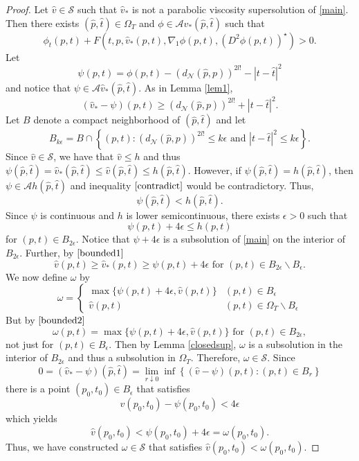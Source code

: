\documentclass[12pt]{amsart}
\theoremstyle{definition}
\theoremstyle{remark}
\numberwithin{equation}{section}
\begin{document}
\begin{proof}  Let $\hat{v} \in \mathcal{S}$ such that $\hat{v}_*$ is not a parabolic viscosity supersolution of \eqref{main}.  Then there exists $(\hat{p},\hat{t}) \in \Omega_T$ and $\phi \in \mathcal{A}\hat{v}_*(\hat{p},\hat{t})$ such that 
\begin{equation}\label{contradict}
\phi_t(p,t)+F(t,p,\hat{v}_*(p,t),\nabla_1\phi(p,t), (D^2\phi(p,t))^\star) > 0.
\end{equation}
Let
$$\psi(p,t) = \phi(p,t) - \left(d_\mathcal{N}(\hat{p},p)\right)^{2l!} - |t-\hat{t}|^2$$
and notice that $\psi \in \mathcal{A}\hat{v}_*(\hat{p},\hat{t})$.
As in Lemma \ref{lem1}, 
\begin{equation}\label{bounded1}
(\hat{v}_*-\psi)(p,t) \geq \left(d_\mathcal{N}(\hat{p},p)\right)^{2l!} + |t-\hat{t}|^2.
\end{equation}
Let $B$ denote a compact neighborhood of $(\hat{p},\hat{t})$ and let $$B_{k\epsilon} = B \cap \left\{ (p,t) : \left(d_\mathcal{N}(\hat{p},p)\right)^{2l!} \leq k\epsilon \text{ and } |t-\hat{t}|^2 \leq k\epsilon \right\}.$$  Since $\hat{v} \in \mathcal{S}$, we have that $\hat{v} \leq h$ and thus $\psi(\hat{p},\hat{t})=\hat{v}_*(\hat{p},\hat{t}) \leq \hat{v}(\hat{p},\hat{t})  \leq h(\hat{p},\hat{t})$.  However, if $\psi(\hat{p},\hat{t}) = h(\hat{p},\hat{t})$, then $\psi \in \mathcal{A}h(\hat{p},\hat{t})$ and inequality $\eqref{contradict}$ would be contradictory.  Thus, 
$$\psi(\hat{p},\hat{t}) < h(\hat{p},\hat{t}).$$
Since $\psi$ is continuous and $h$ is lower semicontinuous, there exists $\epsilon > 0$ such that 
$$\psi(p,t) + 4\epsilon \leq h(p,t)$$
for $(p,t) \in B_{2\epsilon}$. Notice that $\psi + 4\epsilon$ is a subsolution of \eqref{main} on the interior of $B_{2\epsilon}$.  Further, by $\eqref{bounded1}$
\begin{equation}\label{bounded2}
\hat{v}(p,t) \geq \hat{v}_*(p,t) \geq \psi(p,t) + 4\epsilon \text{ for } (p,t) \in B_{2\epsilon} \backslash B_{\epsilon}.
\end{equation}
We now define $\omega$ by 
\begin{equation*}
\omega = \left\{ \begin{array}{ll}
\max\{\psi(p,t) + 4\epsilon,\hat{v}(p,t)\} & (p,t) \in B_\epsilon \\
\hat{v}(p,t) & (p,t) \in \Omega_T\backslash B_\epsilon
\end{array} \right.
\end{equation*}
But by $\eqref{bounded2}$
$$\omega(p,t) = \max\{\psi(p,t) + 4\epsilon,\hat{v}(p,t)\} \text{ for } (p,t) \in B_{2\epsilon},$$
not just for $(p,t) \in B_\epsilon$.  Then by Lemma \ref{closedsup}, $\omega$ is a subsolution in the interior of $B_{2\epsilon}$ 
and thus a subsolution in $\Omega_T$.  Therefore, $\omega \in \mathcal{S}$.  Since
$$0 = (\hat{v}_*-\psi)(\hat{p},\hat{t}) = \lim_{r \downarrow 0} \inf\left\{ (\hat{v} - \psi)(p,t) : (p,t) \in B_r \right\}$$
there is a point $(p_0,t_0) \in B_\epsilon$ that satisfies 
$$\hat{v}(p_0,t_0) - \psi(p_0,t_0) < 4\epsilon$$
which yields 
$$\hat{v}(p_0,t_0) < \psi(p_0,t_0) + 4\epsilon = \omega(p_0,t_0).$$
Thus, we have constructed $\omega \in \mathcal{S}$ that satisfies $\hat{v}(p_0,t_0) < \omega(p_0,t_0)$.
\end{proof}
\end{document}

